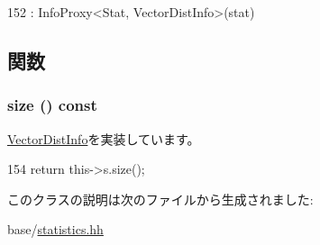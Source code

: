 \begin{DoxyCode}
152 : InfoProxy<Stat, VectorDistInfo>(stat) {}
\end{DoxyCode}


\subsection{関数}
\hypertarget{classStats_1_1VectorDistInfoProxy_a503ab01f6c0142145d3434f6924714e7}{
\subsubsection[{size}]{ size () const}}
\label{classStats_1_1VectorDistInfoProxy_a503ab01f6c0142145d3434f6924714e7}


\hyperlink{classStats_1_1VectorDistInfo_a4051d143efd31726fa13df03ae4e1bce}{VectorDistInfo}を実装しています。


\begin{DoxyCode}
154 { return this->s.size(); }
\end{DoxyCode}


このクラスの説明は次のファイルから生成されました:\begin{DoxyCompactItemize}
\item 
base/\hyperlink{statistics_8hh}{statistics.hh}\end{DoxyCompactItemize}
